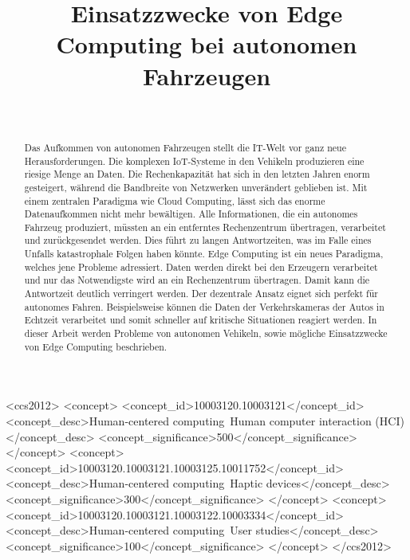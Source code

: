 \documentclass{sigchi}
\def\plaintitle{Einsatzzwecke von Edge Computing bei autonomen Fahrzeugen}
\begin{document}
\title{\plaintitle}

\author{%
   \\
}

\maketitle

\begin{abstract}
Das Aufkommen von autonomen Fahrzeugen stellt die IT-Welt vor ganz neue Herausforderungen. Die komplexen IoT-Systeme in den Vehikeln produzieren eine riesige Menge an Daten. Die Rechenkapazität hat sich in den letzten Jahren enorm gesteigert, während die Bandbreite von Netzwerken unverändert geblieben ist. Mit einem zentralen Paradigma wie Cloud Computing, lässt sich das enorme Datenaufkommen nicht mehr bewältigen. Alle Informationen, die ein autonomes Fahrzeug produziert, müssten an ein entferntes Rechenzentrum übertragen, verarbeitet und zurückgesendet werden. Dies führt zu langen Antwortzeiten, was im Falle eines Unfalls katastrophale Folgen haben könnte. Edge Computing ist ein neues Paradigma, welches jene Probleme adressiert. Daten werden direkt bei den Erzeugern verarbeitet und nur das Notwendigste wird an ein Rechenzentrum übertragen. Damit kann die Antwortzeit deutlich verringert werden. Der dezentrale Ansatz eignet sich perfekt für autonomes Fahren. Beispielsweise können die Daten der Verkehrskameras der Autos in Echtzeit verarbeitet und somit schneller auf kritische Situationen reagiert werden. In dieser Arbeit werden Probleme von autonomen Vehikeln, sowie mögliche Einsatzzwecke von Edge Computing beschrieben.
\end{abstract}


\iffalse

\begin{CCSXML}
    <ccs2012>
    <concept>
    <concept_id>10003120.10003121</concept_id>
    <concept_desc>Human-centered computing~Human computer interaction (HCI)</concept_desc>
    <concept_significance>500</concept_significance>
    </concept>
    <concept>
    <concept_id>10003120.10003121.10003125.10011752</concept_id>
    <concept_desc>Human-centered computing~Haptic devices</concept_desc>
    <concept_significance>300</concept_significance>
    </concept>
    <concept>
    <concept_id>10003120.10003121.10003122.10003334</concept_id>
    <concept_desc>Human-centered computing~User studies</concept_desc>
    <concept_significance>100</concept_significance>
    </concept>
    </ccs2012>
    \end{CCSXML}
    
\end{document}
